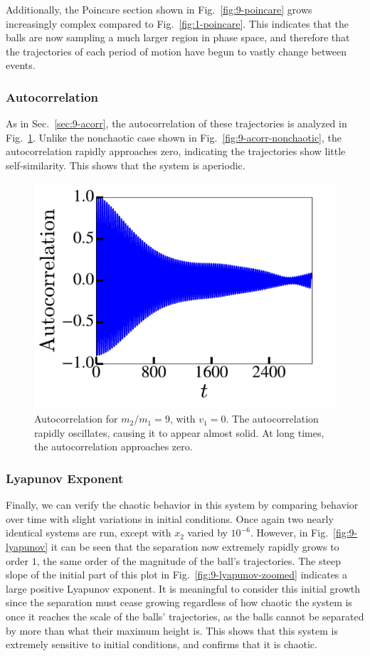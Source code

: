 \documentclass[pra,twocolumn,showpacs,amsmath,amssymb, aps, 10pt]{revtex4-1}
\begin{document}
Additionally, the Poincare section shown in Fig.~\ref{fig:9-poincare} grows
increasingly complex compared to Fig.~\ref{fig:1-poincare}. This indicates that
the balls are now sampling a much larger region in phase space, and therefore that
the trajectories of each period of motion have begun to vastly change between events.

\subsubsection{Autocorrelation}

As in Sec.~\ref{sec:9-acorr}, the autocorrelation of these trajectories is
analyzed in Fig.~\ref{fig:9-acorr}. Unlike the nonchaotic case shown in Fig.~\ref{fig:9-acorr-nonchaotic},
the autocorrelation
rapidly approaches zero, indicating the trajectories show little self-similarity.
This shows that the system is aperiodic.

\begin{figure}
    \includegraphics[width=0.8\linewidth]{r0_1_acorr}
    \caption{Autocorrelation for $m_2/m_1 = 9$, with $v_1=0$. The autocorrelation
    rapidly oscillates, causing it to appear almost solid. At long times,
    the autocorrelation approaches zero.}
    \label{fig:9-acorr}
\end{figure}

\subsubsection{Lyapunov Exponent}

Finally, we can verify the chaotic behavior in this system by comparing behavior
over time with slight variations in initial conditions. Once again two nearly identical
systems are run, except with $x_2$ varied by $10^{-6}$. However, in Fig.~\ref{fig:9-lyapunov}
it can be seen that the separation now extremely rapidly grows to order $1$, the same order
of the magnitude of the ball's trajectories.
The steep slope of the initial part of this plot
in Fig.~\ref{fig:9-lyapunov-zoomed} indicates a large positive Lyapunov exponent.
It is meaningful to consider this initial growth since the separation must cease
growing regardless of how chaotic the system is once it reaches the scale of the
balls' trajectories, as the balls cannot be separated by more than what their
maximum height is.
This shows that this system is extremely sensitive
to initial conditions, and confirms that it is chaotic.
\end{document}

